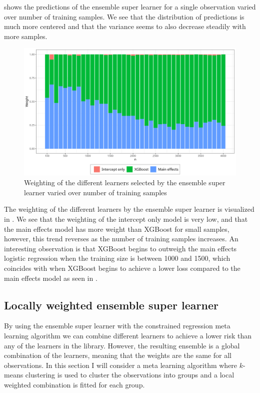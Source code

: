 \documentclass[./main.tex]{subfiles}
\begin{document}
 shows the predictions of the ensemble super learner for a single observation varied over number of training samples. We see that the distribution of predictions is much more centered and that the variance seems to also decrease steadily with more samples. 
\begin{figure}[H]
    \centering
    \includegraphics[width=\textwidth]{figures/esl_weights.png}
    \caption{Weighting of the different learners selected by the ensemble super learner varied over number of training samples}
    \label{fig:esl_weights}
\end{figure}
The weighting of the different learners by the ensemble super learner is visualized in . We see that the weighting of the intercept only model is very low, and that the main effects model has more weight than XGBoost for small samples, however, this trend reverses as the number of training samples increases. An interesting observation is that XGBoost begins to outweigh the main effects logistic regression when the training size is between 1000 and 1500, which coincides with when XGBoost begins to achieve a lower loss compared to the main effects model as seen in .

\subsection{Locally weighted ensemble super learner} \label{locally_weighted_ensemble_super_learner}
By using the ensemble super learner with the constrained regression meta learning algorithm we can combine different learners to achieve a lower risk than any of the learners in the library. However, the resulting ensemble is a global combination of the learners, meaning that the weights are the same for all observations. In this section I will consider a meta learning algorithm where $ k $-means clustering is used to cluster the observations into groups and a local weighted combination is fitted for each group.
\end{document}
